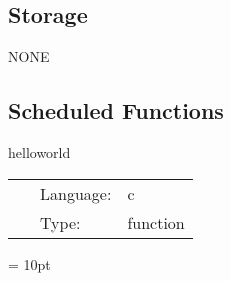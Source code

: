 \documentclass{article}
\begin{document}
\subsection*{Storage}NONE
\subsection*{Scheduled Functions}
\vspace{5mm}


\hspace{5mm} helloworld 

\hspace{5mm}{\it print message to screen } 


\hspace{5mm}

 \begin{tabular*}{160mm}{cll} 
~ & Language:  & c \\ 
~ & Type:  & function \\ 
\end{tabular*} 



\vspace{5mm}\parskip = 10pt 
\end{document}

